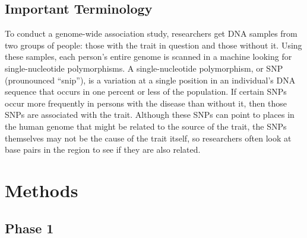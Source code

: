 \documentclass{article}
\begin{document}
\subsection*{Important Terminology}
To conduct a genome-wide association study, researchers get DNA samples from two
groups of people: those with the trait in question and those without it. Using 
these samples, each person's entire genome is scanned in a machine looking for 
single-nucleotide polymorphisms. A single-nucleotide polymorphism, or SNP 
(prounounced ``snip''), is a variation at a single position in an individual's 
DNA sequence that occurs in one percent or less of the population. If certain 
SNPs occur more frequently in persons with the disease than without it, then 
those SNPs are associated with the trait. Although these SNPs can point to places 
in the human genome that might be related to the source of the trait, the SNPs 
themselves may not be the cause of the trait itself, so researchers often look 
at base pairs in the region to see if they are also related\cite{NatureEducat}.

\section*{Methods}
\subsection{Phase 1}





\end{document}
